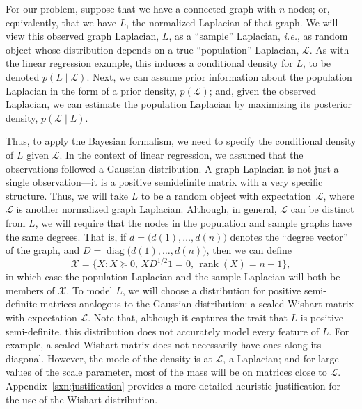 \documentclass[12pt]{article}
\DeclareMathOperator*{\diag}{diag}
\DeclareMathOperator*{\rank}{rank}
\theoremstyle{plain}
\begin{document}
For our problem, suppose that we have a connected graph with $n$ nodes; or, 
equivalently, that we have $L$, the normalized Laplacian of that graph.
We will view this observed graph Laplacian, $L$, as a ``sample'' Laplacian, 
\emph{i.e.}, as random object whose distribution depends on a true 
``population'' Laplacian, $\mathcal{L}$.  
As with the linear regression example, this induces a conditional density 
for $L$, to be denoted $p(L \mid \mathcal{L})$.  
Next, we can assume prior information about the population Laplacian in the 
form of a prior density, $p(\mathcal{L})$; and, 
given the observed Laplacian, we can estimate the population Laplacian by 
maximizing its posterior density, $p(\mathcal{L} \mid L)$.

Thus, to apply the Bayesian formalism, we need to specify the conditional 
density of $L$ given $\mathcal{L}$.  
In the context of linear regression, we assumed that the observations 
followed a Gaussian distribution.  
A graph Laplacian is not just a single observation---it is a positive 
semidefinite matrix with a very specific structure.  
Thus, we will take $L$ to be a random object with expectation~$\mathcal{L}$,
where $\mathcal{L}$ is another normalized graph Laplacian.  
Although, in general, $\mathcal{L}$ can be distinct from $L$, we will 
require that the nodes in the population and sample graphs have the same 
degrees.
That is, if $d = \big(d(1), \dotsc, d(n)\big)$ denotes the ``degree 
vector'' of the graph, and $D = \diag\big(d(1), \dotsc, d(n)\big)$, then we
can define
\begin{equation}
\mathcal{X} = \{ X : X \succeq 0, \, X D^{1/2} 1 = 0, \, \rank(X) = n - 1 \} ,
\label{def:chi-set}
\end{equation}
in which case the population Laplacian and the sample Laplacian will both 
be members of $\mathcal{X}$.  
To model $L$, we will choose a distribution for positive semi-definite 
matrices analogous to the Gaussian distribution: a scaled Wishart matrix 
with expectation $\mathcal{L}$.  
Note that, although it captures the trait that $L$ is positive 
semi-definite, this distribution does not accurately model every feature of 
$L$.
For example, a scaled Wishart matrix does not necessarily have ones along 
its diagonal.  
However, the mode of the density is at $\mathcal{L}$, a Laplacian; and for 
large values of the scale parameter, most of the mass will be on matrices 
close to $\mathcal{L}$.
Appendix~\ref{sxn:justification} provides a more detailed heuristic 
justification for the use of the Wishart distribution.
\end{document}
